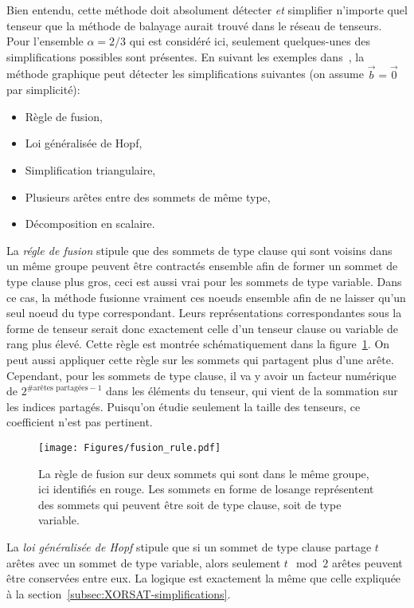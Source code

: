 Bien entendu, cette méthode doit absolument détecter \emph{et} simplifier n'importe quel tenseur que la méthode de balayage aurait trouvé dans le réseau de tenseurs.
Pour l'ensemble $\alpha = 2/3$ qui est considéré ici, seulement quelques-unes des simplifications possibles sont présentes.
En suivant les exemples dans~\cite{denny_algebraically_2012}, la méthode graphique peut détecter les simplifications suivantes (on assume $\vec{b} = \vec{0}$ par simplicité):
\begin{itemize}
    \item Règle de fusion,
    \item Loi généralisée de Hopf,
    \item Simplification triangulaire,
    \item Plusieurs arêtes entre des sommets de même type,
    \item Décomposition en scalaire.
\end{itemize}

La \emph{régle de fusion} stipule que des sommets de type clause qui sont voisins dans un même groupe peuvent être contractés ensemble afin de former un sommet de type clause plus gros, ceci est aussi vrai pour les sommets de type variable.
Dans ce cas, la méthode fusionne vraiment ces noeuds ensemble afin de ne laisser qu'un seul noeud du type correspondant.
Leurs représentations correspondantes sous la forme de tenseur serait donc exactement celle d'un tenseur clause ou variable de rang plus élevé.
Cette règle est montrée schématiquement dans la figure~\ref{fig:fusion_rule}.
On peut aussi appliquer cette règle sur les sommets qui partagent plus d'une arête.
Cependant, pour les sommets de type clause, il va y avoir un facteur numérique de $2^{\#\text{arêtes partagées} - 1}$ dans les éléments du tenseur, qui vient de la sommation sur les indices partagés.
Puisqu'on étudie seulement la taille des tenseurs, ce coefficient n'est pas pertinent.
\begin{figure}[h]
    \centering
    \texttt{[image: Figures/fusion\_rule.pdf]}
    \caption[Représentation graphique de la règle de fusion sur deux sommets qui sont dans le même groupe.]{La règle de fusion sur deux sommets qui sont dans le même groupe, ici identifiés en rouge. Les sommets en forme de losange représentent des sommets qui peuvent être soit de type clause, soit de type variable.}
    \label{fig:fusion_rule}
\end{figure}

La \emph{loi généralisée de Hopf} stipule que si un sommet de type clause partage $t$ arêtes avec un sommet de type variable, alors seulement $t \mod{2}$ arêtes peuvent être conservées entre eux.
La logique est exactement la même que celle expliquée à la section~\ref{subsec:XORSAT-simplifications}.

